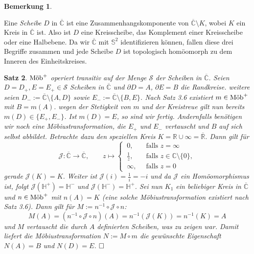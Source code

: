 \documentclass[11pt]{book}
\numberwithin{dummy}{section}
\newtheorem{theorem}{Satz}[section]
\newtheorem{remark}[theorem]{Bemerkung}
\theoremstyle{nonumberbreak}
\newenvironment{defin}[1][]{\ifthenelse{\equal{#1}{}}{\definition}{\definition[#1]}\rm}{\enddefinition}
\newenvironment{pr}[1][]{\ifthenelse{\equal{#1}{}}{\proof}{\proof[#1]}\rm}{\endproof}
\newcommand{\C}{\mathbb{C}}
\newcommand{\CC}{\overline{\mathbb{C}}}
\newcommand{\la}{\longrightarrow}
\newcommand{\mob}{\textup{Möb}^+}
\begin{document}
\begin{spacing}{1.4}
\begin{remark}
\end{remark}

\begin{defin}     %
Eine \textit{Scheibe} $D$ in $\CC$ ist eine Zusammenhangskomponente von $\CC \setminus K$, wobei $K$ ein Kreis in $\CC$ ist. Also ist $D$ eine Kreisscheibe, das Komplement einer Kreisscheibe oder eine Halbebene. Da wir $\CC$ mit $\mathbb{S}^2$ identifizieren können, fallen diese drei Begriffe zusammen und jede Scheibe $D$ ist topologisch homöomorph zu dem Inneren des Einheitskreises.

\end{defin}

\begin{theorem}   %
$\mob$ operiert transitiv auf der Menge $\mathcal{S}$ der Scheiben in $\CC$.
\begin{pr}
Seien $D=D_+,E=E_+ \in \mathcal{S}$ Scheiben in $\CC$ und $\partial D = A$, $\partial E = B$ die Randkreise. weitere seien $D_- := \CC \setminus \{A, D\}$ sowie $E_- := \CC \setminus \{B, E\}$. Nach Satz 3.6 existiert $m \in \mob$ mit $B=m(A)$. wegen der Stetigkeit von $m$ und der Kreistreue gilt nun bereits $m(D) \in \{E_+,E_-\}$. Ist $m(D) = E$, so sind wir fertig. Andernfalls benötigen wir noch eine Möbiustransformation, die $E_+$ und $E_-$ vertauscht und $B$ auf sich selbst abbildet. Betrachte dazu den speziellen Kreis $K= \mathbb{R} \cup \infty= \overline{\mathbb{R}}$. Dann gilt für
$$\mathcal{J}: \CC \la \CC, \qquad z \mapsto \begin{cases} \ 0, & \ \textrm{ falls } z = \infty \\ \ \frac{1}{z}, & \ \textrm{ falls } z \in \C \setminus \{0\}, \\ \ \infty, & \ \textrm{ falls } z=0 \end{cases}$$
gerade $\mathcal{J}(K)=K$. Weiter ist $\mathcal{J}(i)=\frac{1}{i} = -i$ und da $\mathcal{J}$ ein Homöomorphismus ist, folgt $\mathcal{J}(\mathbb{H}^{+}) = \mathbb{H}^-$ und $\mathcal{J}(\mathbb{H}^{-})= \mathbb{H}^{+}$. Sei nun $K_1$ ein beliebiger Kreis in $\CC$ und $n \in \mob$ mit $n(A)=K$ (eine solche Möbiustransformation existiert nach Satz 3.6). Dann gilt für $M:= n^{-1}\circ \mathcal{J} \circ n$:
$$M(A) = (n^{-1}\circ \mathcal{J} \circ n)(A) = n^{-1}(\mathcal{J}(K)) = n^{-1}(K) = A$$
und $M$ vertauscht die durch $A$ definierten Scheiben, was zu zeigen war. Damit liefert die Möbiustransformation $N:= M \circ m$ die gewünschte Eigenschaft $N(A)=B$ und $N(D)=E$. $\hfill \Box$
\end{pr}
\end{theorem}










\end{spacing}
\end{document}

